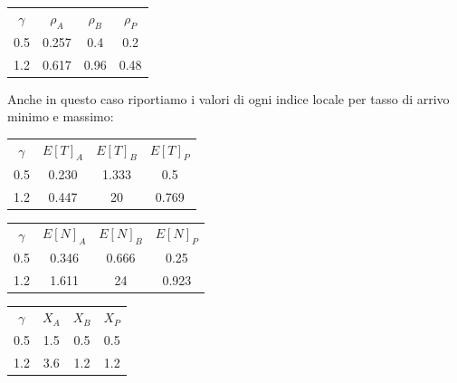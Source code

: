 \begin{table}[!htbp]
    \centering
    \begin{tabular}{cccc}
         $\gamma$ & $\rho_{A}$ & $\rho_{B}$ & $\rho_{P}$\\
         0.5 & 0.257 & 0.4 & 0.2 \\
         1.2	& 0.617 & 0.96 & 0.48 \\
    \end{tabular}
    \label{tab:my_label}
\end{table}

Anche in questo caso riportiamo i valori di ogni indice locale per tasso di arrivo minimo e massimo:

\begin{table}[!htbp]
    \centering
    \begin{tabular}{cccc}
        $\gamma$ & $E[T]_{A}$ & $E[T]_{B}$ & $E[T]_{P}$ \\         
        0.5 & 0.230 & 1.333 & 0.5 \\
        1.2 & 0.447 & 20 & 0.769 \\
    \end{tabular}
    \label{tab:et_values}
\end{table}

\begin{table}[!htbp]
    \centering
    \begin{tabular}{cccc}
        $\gamma$ & $E[N]_{A}$ & $E[N]_{B}$ & $E[N]_{P}$ \\         
        0.5 & 0.346 & 0.666 & 0.25 \\
        1.2 & 1.611 & 24 & 0.923 \\
    \end{tabular}
    \label{tab:en_values}
\end{table}

\begin{table}[!htbp]
    \centering
    \begin{tabular}{cccc}
        $\gamma$ & $X_{A}$ & $X_{B}$ & $X_{P}$ \\         
        0.5 & 1.5 & 0.5 & 0.5 \\
        1.2 & 3.6 & 1.2 & 1.2 \\
    \end{tabular}
    \label{tab:x_values}
\end{table}

